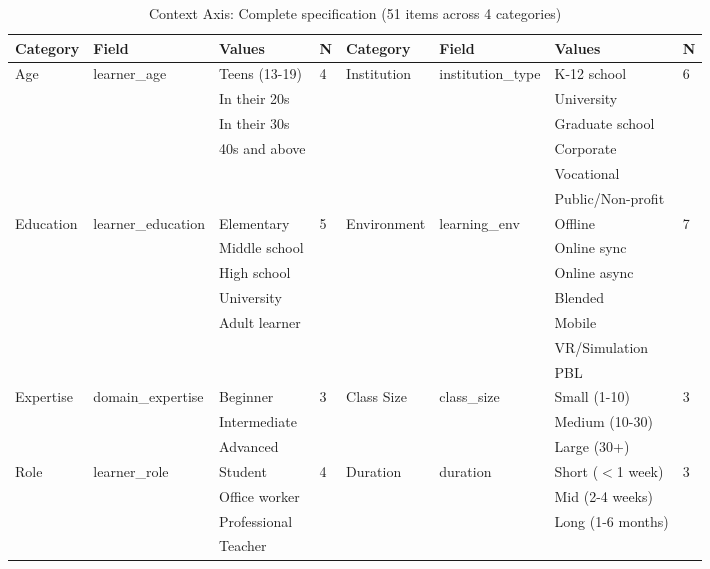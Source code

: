 \begin{table}[t]
\centering
\small
\caption{Context Axis: Complete specification (51 items across 4 categories)}
\label{tab:context-axis-all}
\begin{tabular}{llll|llll}
\toprule
\textbf{Category} & \textbf{Field} & \textbf{Values} & \textbf{N} & \textbf{Category} & \textbf{Field} & \textbf{Values} & \textbf{N} \\
\midrule
\multirow{4}{*}{Age} & \multirow{4}{*}{learner\_age} & Teens (13-19) & \multirow{4}{*}{4} & \multirow{6}{*}{Institution} & \multirow{6}{*}{institution\_type} & K-12 school & \multirow{6}{*}{6} \\
& & In their 20s & & & & University & \\
& & In their 30s & & & & Graduate school & \\
& & 40s and above & & & & Corporate & \\
& & & & & & Vocational & \\
& & & & & & Public/Non-profit & \\
\midrule
\multirow{5}{*}{Education} & \multirow{5}{*}{learner\_education} & Elementary & \multirow{5}{*}{5} & \multirow{7}{*}{Environment} & \multirow{7}{*}{learning\_env} & Offline & \multirow{7}{*}{7} \\
& & Middle school & & & & Online sync & \\
& & High school & & & & Online async & \\
& & University & & & & Blended & \\
& & Adult learner & & & & Mobile & \\
& & & & & & VR/Simulation & \\
& & & & & & PBL & \\
\midrule
\multirow{3}{*}{Expertise} & \multirow{3}{*}{domain\_expertise} & Beginner & \multirow{3}{*}{3} & \multirow{3}{*}{Class Size} & \multirow{3}{*}{class\_size} & Small (1-10) & \multirow{3}{*}{3} \\
& & Intermediate & & & & Medium (10-30) & \\
& & Advanced & & & & Large (30+) & \\
\midrule
\multirow{4}{*}{Role} & \multirow{4}{*}{learner\_role} & Student & \multirow{4}{*}{4} & \multirow{3}{*}{Duration} & \multirow{3}{*}{duration} & Short ($<$1 week) & \multirow{3}{*}{3} \\
& & Office worker & & & & Mid (2-4 weeks) & \\
& & Professional & & & & Long (1-6 months) & \\
& & Teacher & & & & & \\

\end{tabular}
\end{table}
